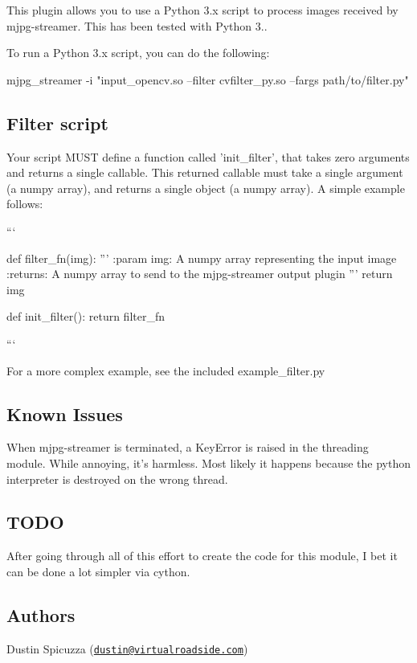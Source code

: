 This plugin allows you to use a Python 3.\+x script to process images received by mjpg-\/streamer. This has been tested with Python 3..

To run a Python 3.\+x script, you can do the following\+: \begin{DoxyVerb}mjpg_streamer -i "input_opencv.so --filter cvfilter_py.so --fargs path/to/filter.py"
\end{DoxyVerb}


\subsection*{Filter script }

Your script M\+U\+S\+T define a function called 'init\+\_\+filter', that takes zero arguments and returns a single callable. This returned callable must take a single argument (a numpy array), and returns a single object (a numpy array). A simple example follows\+:

```

def filter\+\_\+fn(img)\+: ''' \+:param img\+: A numpy array representing the input image \+:returns\+: A numpy array to send to the mjpg-\/streamer output plugin ''' return img

def init\+\_\+filter()\+: return filter\+\_\+fn

```

For a more complex example, see the included example\+\_\+filter.\+py

\subsection*{Known Issues }

When mjpg-\/streamer is terminated, a {\ttfamily Key\+Error} is raised in the threading module. While annoying, it's harmless. Most likely it happens because the python interpreter is destroyed on the wrong thread.

\subsection*{T\+O\+D\+O }

After going through all of this effort to create the code for this module, I bet it can be done a lot simpler via cython.

\subsection*{Authors }

Dustin Spicuzza (\href{mailto:dustin@virtualroadside.com}{\tt dustin@virtualroadside.\+com}) 